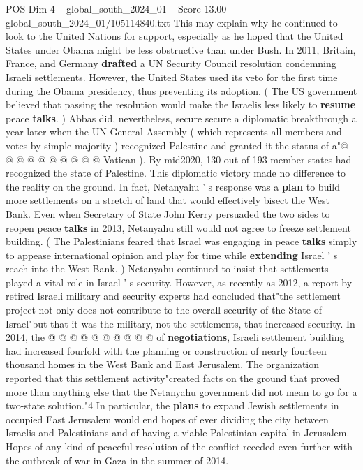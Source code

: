 \begin{textsample}{POS Dim 4 – global\_south\_2024\_01 – Score 13.00 – global\_south\_2024\_01/105114840.txt}
This may explain why he continued to look to the United Nations for support, especially as he hoped that the United States under Obama might be less obstructive than under Bush.
In 2011, Britain, France, and Germany \textbf{drafted} a UN Security Council resolution condemning Israeli settlements.
However, the United States used its veto for the first time during the Obama presidency, thus preventing its adoption. ( The US government believed that passing the resolution would make the Israelis less likely to \textbf{resume} peace \textbf{talks}. ) Abbas did, nevertheless, secure secure a diplomatic breakthrough a year later when the UN General Assembly ( which represents all members and votes by simple majority ) recognized Palestine and granted it the status of a"@ @ @ @ @ @ @ @ @ @ Vatican ).
By mid2020, 130 out of 193 member states had recognized the state of Palestine.
This diplomatic victory made no difference to the reality on the ground.
In fact, Netanyahu ' s response was a \textbf{plan} to build more settlements on a stretch of land that would effectively bisect the West Bank.
Even when Secretary of State John Kerry persuaded the two sides to reopen peace \textbf{talks} in 2013, Netanyahu still would not agree to freeze settlement building. ( The Palestinians feared that Israel was engaging in peace \textbf{talks} simply to appease international opinion and play for time while \textbf{extending} Israel ' s reach into the West Bank. ) Netanyahu continued to insist that settlements played a vital role in Israel ' s security.
However, as recently as 2012, a report by retired Israeli military and security experts had concluded that"the settlement project not only does not contribute to the overall security of the State of Israel"but that it was the military, not the settlements, that increased security.
In 2014, the @ @ @ @ @ @ @ @ @ @ of \textbf{negotiations}, Israeli settlement building had increased fourfold with the planning or construction of nearly fourteen thousand homes in the West Bank and East Jerusalem.
The organization reported that this settlement activity"created facts on the ground that proved more than anything else that the Netanyahu government did not mean to go for a two-state solution."4 In particular, the \textbf{plans} to expand Jewish settlements in occupied East Jerusalem would end hopes of ever dividing the city between Israelis and Palestinians and of having a viable Palestinian capital in Jerusalem.
Hopes of any kind of peaceful resolution of the conflict receded even further with the outbreak of war in Gaza in the summer of 2014.

\end{textsample}
